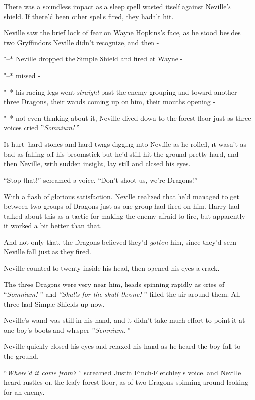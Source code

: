 There was a soundless impact as a sleep spell wasted itself against
Neville's shield. If there'd been other spells fired, they hadn't hit.

Neville saw the brief look of fear on Wayne Hopkins's face, as he stood
besides two Gryffindors Neville didn't recognize, and then -

"--* Neville dropped the Simple Shield and fired at Wayne -

"--* missed -

"--* his racing legs went \emph{straight} past the enemy grouping and
toward another three Dragons, their wands coming up on him, their mouths
opening -

"--* not even thinking about it, Neville dived down to the forest floor
just as three voices cried ''\emph{Somnium!} ''

It hurt, hard stones and hard twigs digging into Neville as he rolled,
it wasn't as bad as falling off his broomstick but he'd still hit the
ground pretty hard, and then Neville, with sudden insight, lay still and
closed his eyes.

``Stop that!'' screamed a voice. ``Don't shoot us, we're Dragons!''

With a flash of glorious satisfaction, Neville realized that he'd
managed to get between two groups of Dragons just as one group had fired
on him. Harry had talked about this as a tactic for making the enemy
afraid to fire, but apparently it worked a bit better than that.

And not only that, the Dragons believed they'd \emph{gotten} him, since
they'd seen Neville fall just as they fired.

Neville counted to twenty inside his head, then opened his eyes a crack.

The three Dragons were very near him, heads spinning rapidly as cries of
``\emph{Somnium!} '' and \emph{''Skulls for the skull throne!} '' filled the
air around them. All three had Simple Shields up now.

Neville's wand was still in his hand, and it didn't take much effort to
point it at one boy's boots and whisper ''\emph{Somnium.} ''

Neville quickly closed his eyes and relaxed his hand as he heard the boy
fall to the ground.

``\emph{Where'd it come from?} '' screamed Justin Finch-Fletchley's voice,
and Neville heard rustles on the leafy forest floor, as of two Dragons
spinning around looking for an enemy.

